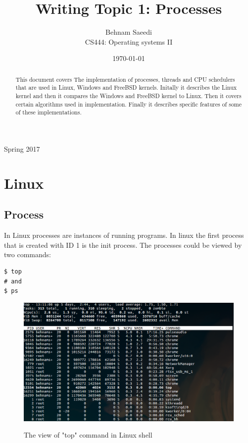 \documentclass[journal,10pt,onecolumn,compsoc,letterpaper,draftclsnofoot,table,xcdraw]{IEEEtran} \usepackage[margin=0.75in]{geometry}
\title{Writing Topic 1: Processes}
\author{Behnam Saeedi\\ CS444: Operating systems II}
\date{\today}
\begin{document}
\maketitle
\begin{centering}
Spring 2017
\begin{abstract}
\noindent This document covers The implementation of processes, threads and CPU schedulers that are used in Linux, Windows and FreeBSD kernels. Initally it describes the Linux kernel and then it compares the Windows and FreeBSD kernel to Linux. Then it covers certain algorithms used in implementation. Finally it describes specific features of some of these implementations. 
\end{abstract}
\end{centering}
\newpage
\tableofcontents
\newpage 
\section{Linux}
\subsection{Process}
\noindent In Linux processes are instances of running programs. In linux the first process that is created with ID 1 is the init process. The processes could be viewed by two commands:
\begin{verbatim}
$ top
# and
$ ps
\end{verbatim}

\begin{figure}[h]
\centering
\includegraphics[width=150mm]{graphics/Top-view} \\
\caption{The view of "top" command in Linux shell}
\end{figure}
\end{document}
